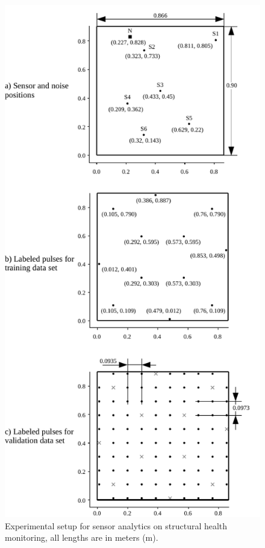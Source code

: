 \begin{figure}[t!]
	\centering
	\includegraphics[width=\columnwidth]{../figures/histograms/data_set.pdf}
	\caption{Experimental setup for sensor analytics on structural health monitoring, all lengths are in meters (m).}
	\label{fig:data_set}
\end{figure}

